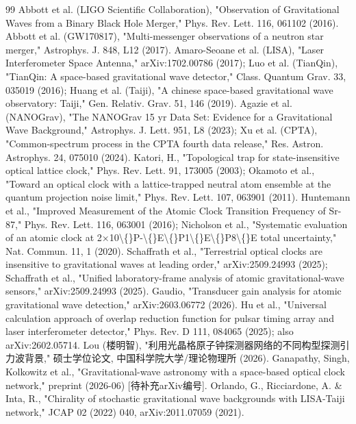 \documentclass[12pt,a4paper]{article}
\begin{document}
\begin{thebibliography}{99}
 Abbott et al. (LIGO Scientific Collaboration), "Observation of Gravitational Waves from a Binary Black Hole Merger," Phys. Rev. Lett. 116, 061102 (2016).
 Abbott et al. (GW170817), "Multi-messenger observations of a neutron star merger," Astrophys. J. 848, L12 (2017).
 Amaro-Seoane et al. (LISA), "Laser Interferometer Space Antenna," arXiv:1702.00786 (2017); Luo et al. (TianQin), "TianQin: A space-based gravitational wave detector," Class. Quantum Grav. 33, 035019 (2016); Huang et al. (Taiji), "A chinese space-based gravitational wave observatory: Taiji," Gen. Relativ. Grav. 51, 146 (2019).
 Agazie et al. (NANOGrav), "The NANOGrav 15 yr Data Set: Evidence for a Gravitational Wave Background," Astrophys. J. Lett. 951, L8 (2023); Xu et al. (CPTA), "Common-spectrum process in the CPTA fourth data release," Res. Astron. Astrophys. 24, 075010 (2024).
 Katori, H., "Topological trap for state-insensitive optical lattice clock," Phys. Rev. Lett. 91, 173005 (2003); Okamoto et al., "Toward an optical clock with a lattice-trapped neutral atom ensemble at the quantum projection noise limit," Phys. Rev. Lett. 107, 063901 (2011).
 Huntemann et al., "Improved Measurement of the Atomic Clock Transition Frequency of Sr-87," Phys. Rev. Lett. 116, 063001 (2016); Nicholson et al., "Systematic evaluation of an atomic clock at 2×10\textbackslash\{\}P-\textbackslash\{\}E\textbackslash\{\}P1\textbackslash\{\}E\textbackslash\{\}P8\textbackslash\{\}E total uncertainty," Nat. Commun. 11, 1 (2020).
 Schaffrath et al., "Terrestrial optical clocks are insensitive to gravitational waves at leading order," arXiv:2509.24993 (2025); Schaffrath et al., "Unified laboratory-frame analysis of atomic gravitational-wave sensors," arXiv:2509.24993 (2025).
 Gaudio, "Transducer gain analysis for atomic gravitational wave detection," arXiv:2603.06772 (2026).
 Hu et al., "Universal calculation approach of overlap reduction function for pulsar timing array and laser interferometer detector," Phys. Rev. D 111, 084065 (2025); also arXiv:2602.05714.
 Lou (楼明智), "利用光晶格原子钟探测器网络的不同构型探测引力波背景," 硕士学位论文, 中国科学院大学/理论物理所 (2026).
 Ganapathy, Singh, Kolkowitz et al., "Gravitational-wave astronomy with a space-based optical clock network," preprint (2026-06) [待补充arXiv编号].
 Orlando, G., Ricciardone, A. \& Inta, R., "Chirality of stochastic gravitational wave backgrounds with LISA-Taiji network," JCAP 02 (2022) 040, arXiv:2011.07059 (2021).

\end{thebibliography}
\end{document}
